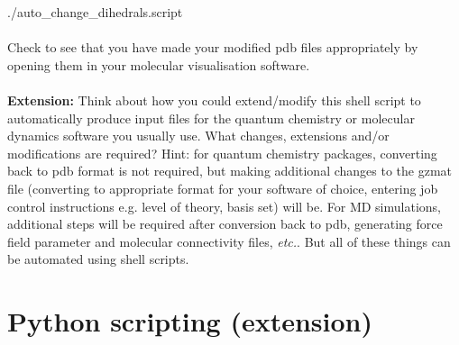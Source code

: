 \documentclass{article}
\begin{document}
./auto\_change\_dihedrals.script\\
\\
Check to see that you have made your modified pdb files appropriately by opening them in your molecular visualisation software.\\
\\
\noindent
\textbf{Extension:} Think about how you could extend/modify this shell script to automatically produce input files for the quantum chemistry or molecular dynamics software you usually use. What changes, extensions and/or modifications are required? Hint: for quantum chemistry packages, converting back to pdb format is not required, but making additional changes to the gzmat file (converting to appropriate format for your software of choice, entering job control instructions e.g. level of theory, basis set) will be. For MD simulations, additional steps will be required after conversion back to pdb, generating force field parameter and molecular connectivity files, \textit{etc.}. But all of these things can be automated using shell scripts.

\clearpage

\section{Python scripting (extension)}
\end{document}
